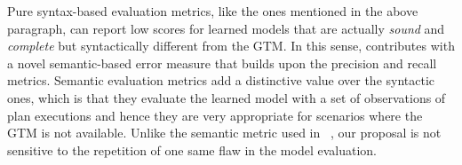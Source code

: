 Pure syntax-based evaluation metrics, like the ones mentioned in the above paragraph, can report low scores for learned models that are actually {\em sound} and {\em complete} but syntactically different from the GTM. In this sense, \FAMA contributes with a novel semantic-based error measure that builds upon the precision and recall metrics. Semantic evaluation metrics add a distinctive value over the syntactic ones, which is that they evaluate the learned model with a set of observations of plan executions and hence they are very appropriate for scenarios where the GTM is not available. Unlike the semantic metric used in \ARMS~\cite{yang2007learning}, our proposal is not sensitive to the repetition of one same flaw in the model evaluation.





